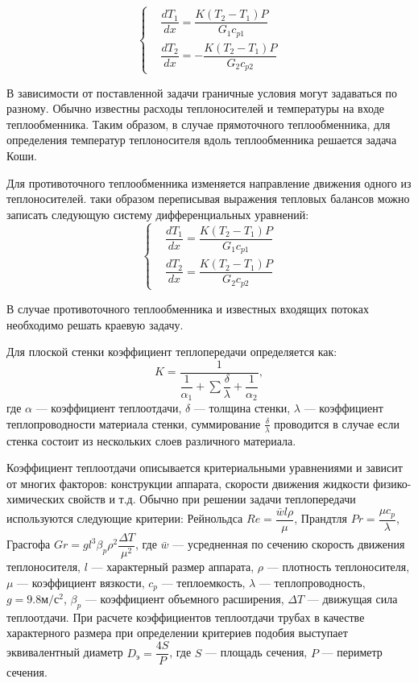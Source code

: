  \begin{equation}
 \left\{
 \begin{aligned}
 &\dfrac{dT_1}{dx}=\dfrac{K(T_2-T_1)P}{G_1 c_{p1}}        \\
 &\dfrac{dT_2}{dx}=-\dfrac{K(T_2-T_1)P}{G_2 c_{p2}}            
 \end{aligned}
 \right.
 \end{equation}

В зависимости от поставленной задачи граничные условия могут задаваться по разному. Обычно известны расходы теплоносителей и температуры на входе теплообменника. Таким образом, в случае прямоточного теплообменника, для определения температур теплоносителя вдоль теплообменника решается задача Коши. 

Для противоточного теплообменника изменяется направление движения одного из теплоносителей. таки образом переписывая выражения тепловых балансов  можно записать следующую систему дифференциальных уравнений:
 \begin{equation}
 \left\{
 \begin{aligned}
 &\dfrac{dT_1}{dx}=\dfrac{K(T_2-T_1)P}{G_1 c_{p1}}        \\
 &\dfrac{dT_2}{dx}=\dfrac{K(T_2-T_1)P}{G_2 c_{p2}}            
 \end{aligned}
 \right. 
 \end{equation}
 
В случае противоточного теплообменника и известных входящих потоках необходимо решать краевую задачу.

Для плоской стенки коэффициент теплопередачи определяется как:
\begin{equation}
	K=\dfrac{1}{\dfrac{1}{\alpha_1} + \sum \dfrac{\delta}{\lambda} + \dfrac{1}{\alpha_2}},
\end{equation}
где $\alpha$ --- коэффициент теплоотдачи, $\delta$ --- толщина стенки, $\lambda$ --- коэффициент теплопроводности материала стенки, суммирование $\frac{\delta}{\lambda}$ проводится в случае если стенка состоит из нескольких слоев различного материала. 

Коэффициент теплоотдачи описывается критериальными уравнениями и зависит от многих факторов: конструкции аппарата, скорости движения жидкости физико-химических свойств и т.д. Обычно при решении задачи теплопередачи используются следующие критерии: Рейнольдса $Re=\dfrac{\bar{w} l \rho}{\mu}$, Прандтля $Pr=\dfrac{\mu c_p}{\lambda}$, Грасгофа $ Gr= g l^3 \beta_p \rho^2 \dfrac{\Delta T}{\mu^2}$, где $\bar{w}$ --- усредненная по сечению скорость движения теплоносителя, $l$ --- характерный размер аппарата, $\rho$ --- плотность теплоносителя, $\mu$ --- коэффициент вязкости, $c_p$ --- теплоемкость,  $\lambda$ --- теплопроводность, $g=9.8 м/с^2$, $\beta_p$ --- коэффициент объемного расширения, $\Delta T$ --- движущая сила теплоотдачи. При расчете коэффициентов теплоотдачи трубах в качестве характерного размера при определении критериев подобия выступает эквивалентный диаметр $D_э=\dfrac{4S}{P}$, где $S$ --- площадь сечения, $P$ --- периметр сечения.

